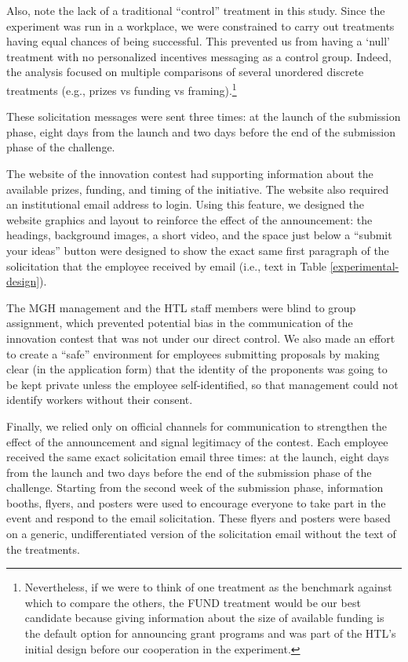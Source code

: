 \documentclass[11pt, titlepage]{article}
\begin{document}
Also, note the lack of a traditional ``control'' treatment in this
study. Since the experiment was run in a workplace, we were constrained
to carry out treatments having equal chances of being successful. This
prevented us from having a `null' treatment with no personalized
incentives messaging as a control group. Indeed, the analysis focused on
multiple comparisons of several unordered discrete treatments (e.g.,
prizes vs funding vs framing).\footnote{Nevertheless, if we were to
  think of one treatment as the benchmark against which to compare the
  others, the FUND treatment would be our best candidate because giving
  information about the size of available funding is the default option
  for announcing grant programs and was part of the HTL's initial design
  before our cooperation in the experiment.}

These solicitation messages were sent three times: at the launch of the
submission phase, eight days from the launch and two days before the end
of the submission phase of the challenge.

The website of the innovation contest had supporting information about
the available prizes, funding, and timing of the initiative. The website
also required an institutional email address to login. Using this
feature, we designed the website graphics and layout to reinforce the
effect of the announcement: the headings, background images, a short
video, and the space just below a ``submit your ideas'' button were
designed to show the exact same first paragraph of the solicitation that
the employee received by email (i.e., text in Table
\ref{experimental-design}).

The MGH management and the HTL staff members were blind to group
assignment, which prevented potential bias in the communication of the
innovation contest that was not under our direct control. We also made
an effort to create a ``safe'' environment for employees submitting
proposals by making clear (in the application form) that the identity of
the proponents was going to be kept private unless the employee
self-identified, so that management could not identify workers without
their consent.

Finally, we relied only on official channels for communication to
strengthen the effect of the announcement and signal legitimacy of the
contest. Each employee received the same exact solicitation email three
times: at the launch, eight days from the launch and two days before the
end of the submission phase of the challenge. Starting from the second
week of the submission phase, information booths, flyers, and posters
were used to encourage everyone to take part in the event and respond to
the email solicitation. These flyers and posters were based on a
generic, undifferentiated version of the solicitation email without the
text of the treatments.
\end{document}
